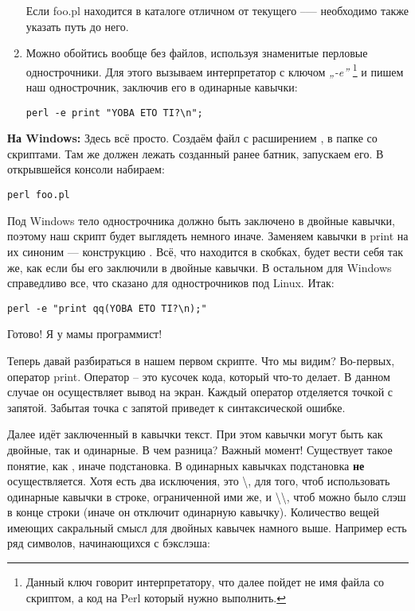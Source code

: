 \begin{enumerate}
Если foo.pl находится в каталоге отличном от текущего --— необходимо также 
указать путь до него. 

\item Можно обойтись вообще без файлов, используя знаменитые перловые
однострочники. Для этого вызываем интерпретатор с ключом \emph{„-e”} 
\footnote{Данный
ключ говорит интерпретатору, что далее пойдет не имя файла со скриптом,
а код на Perl который нужно выполнить.}
и пишем наш однострочник, заключив его в одинарные кавычки:

\texttt{perl -e \textquotesingle print "YOBA ETO TI?\textbackslash n";}\textquotesingle
\end{enumerate}

\textbf{На Windows:}
Здесь всё просто. Создаём файл с расширением  , в папке со скриптами.
Там же должен лежать созданный ранее батник, запускаем его. В открывшейся консоли
набираем:

\texttt{perl foo.pl}

Под Windows тело однострочника должно быть заключено в двойные кавычки, поэтому 
наш скрипт будет выглядеть немного иначе. Заменяем кавычки в print на их синоним ---
конструкцию .
Всё, что находится в скобках, будет вести себя так же, как если бы его
заключили в двойные кавычки. В остальном для Windows справедливо
все, что сказано для однострочников под Linux. Итак:

\texttt{perl -e "print qq(YOBA ETO TI?\textbackslash n);"}

Готово! Я у мамы программист!

Теперь давай разбираться в нашем первом скрипте. Что мы видим?
Во-первых, оператор print. Оператор -- это кусочек кода, который
что-то делает. В данном случае он осуществляет вывод на экран.
Каждый оператор отделяется точкой с запятой. Забытая точка с запятой
приведет к синтаксической ошибке.

Далее идёт заключенный в кавычки текст. При этом кавычки могут быть
как двойные, так и одинарные. В чем разница? Важный момент! Существует
такое понятие, как  , иначе подстановка. В одинарных
кавычках подстановка \textbf{не} осуществляется. Хотя есть два исключения, это 
\textbackslash\textquotesingle , для того, чтоб использовать одинарные кавычки в строке,
 ограниченной ими же, и
\textbackslash\textbackslash, чтоб можно было  слэш в
конце строки (иначе он отключит одинарную кавычку). Количество вещей имеющих
сакральный смысл для двойных кавычек намного выше. Например есть ряд символов, 
начинающихся с бэкслэша:

